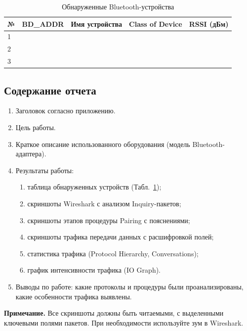 \begin{table}[htbp]
\centering
\caption{Обнаруженные Bluetooth-устройства}
\label{tab:bt_devices}
\begin{tabularx}{\textwidth}{lXXXX}
\toprule
\textbf{№} & \textbf{BD\_ADDR} & \textbf{Имя устройства} & \textbf{Class of Device} & \textbf{RSSI (дБм)} \\
\midrule
1 & & & & \\
2 & & & & \\
3 & & & & \\
\bottomrule
\end{tabularx}
\end{table}

\subsection{Содержание отчета}
\begin{enumerate}[nosep, leftmargin=*]
    \item Заголовок согласно приложению.
    \item Цель работы.
    \item Краткое описание использованного оборудования (модель Bluetooth-адаптера).
    \item Результаты работы:
    \begin{enumerate}[label=\alph*), nosep]
        \item таблица обнаруженных устройств (Табл.~\ref{tab:bt_devices});
        \item скриншоты Wireshark с анализом Inquiry-пакетов;
        \item скриншоты этапов процедуры Pairing с пояснениями;
        \item скриншоты трафика передачи данных с расшифровкой полей;
        \item статистика трафика (Protocol Hierarchy, Conversations);
        \item график интенсивности трафика (IO Graph).
    \end{enumerate}
    \item Выводы по работе: какие протоколы и процедуры были проанализированы, какие особенности трафика выявлены.
\end{enumerate}

\textbf{Примечание.} Все скриншоты должны быть читаемыми, с выделенными ключевыми полями пакетов. При необходимости используйте зум в Wireshark.

